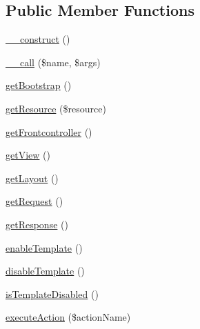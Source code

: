 \subsection*{Public Member Functions}
\begin{DoxyCompactItemize}
\item 
\hyperlink{class_anemo_1_1_controller_1_1_controller_abstract_a095c5d389db211932136b53f25f39685}{\_\-\_\-construct} ()
\item 
\hyperlink{class_anemo_1_1_controller_1_1_controller_abstract_af231e86ad32039b9573ae228db5a29fa}{\_\-\_\-call} (\$name, \$args)
\item 
\hyperlink{class_anemo_1_1_controller_1_1_controller_abstract_a300f7e1c5d57efbb6cad4fe8c6564b85}{getBootstrap} ()
\item 
\hyperlink{class_anemo_1_1_controller_1_1_controller_abstract_aa2c1b8634bea77c8eb6a7d909511bd52}{getResource} (\$resource)
\item 
\hyperlink{class_anemo_1_1_controller_1_1_controller_abstract_aa182525e446da02ad9af5d903f3f8f66}{getFrontcontroller} ()
\item 
\hyperlink{class_anemo_1_1_controller_1_1_controller_abstract_a50677812ea3f0258f7d03bbac5265413}{getView} ()
\item 
\hyperlink{class_anemo_1_1_controller_1_1_controller_abstract_a5c316721766e9cd8ad5d0085e64048ed}{getLayout} ()
\item 
\hyperlink{class_anemo_1_1_controller_1_1_controller_abstract_adf1a35ad20e475c59cc0967d5764aa22}{getRequest} ()
\item 
\hyperlink{class_anemo_1_1_controller_1_1_controller_abstract_a6c907e8af775e517a77037dd0164222f}{getResponse} ()
\item 
\hyperlink{class_anemo_1_1_controller_1_1_controller_abstract_af8ea319b632b63ba5e376608bdbbd6b6}{enableTemplate} ()
\item 
\hyperlink{class_anemo_1_1_controller_1_1_controller_abstract_a183063744e28a4b5b5996cd3a854f15d}{disableTemplate} ()
\item 
\hyperlink{class_anemo_1_1_controller_1_1_controller_abstract_a0bb5a54f2aa220dddebd6cb13165857d}{isTemplateDisabled} ()
\item 
\hyperlink{class_anemo_1_1_controller_1_1_controller_abstract_a70688b48b1371f6e70d6521d651aa3e6}{executeAction} (\$actionName)
\end{DoxyCompactItemize}
